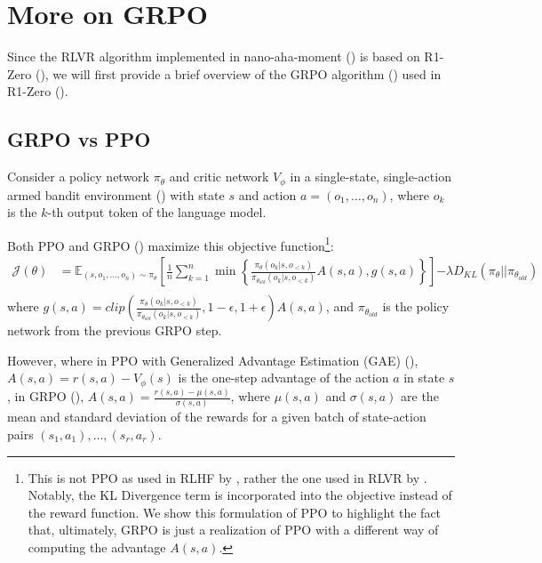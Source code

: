 \documentclass{article} %
\theoremstyle{definition}
\begin{document}
\section{More on GRPO}

Since the RLVR algorithm implemented in nano-aha-moment (\cite{nano-aha-moment}) is based on 
R1-Zero (\cite{r1}), we will first provide a brief overview of the GRPO
algorithm (\cite{grpo}) used in R1-Zero (\cite{r1}).

\subsection{GRPO vs PPO}
Consider a policy network $\pi_\theta$ and critic network $V_\phi$ in a single-state,
single-action armed bandit environment (\cite{Sutton-and-Barto-1998, contextualbandit}) 
with state $s$ and action $a = (o_1, \dots, o_n)$,
where $o_k$ is the $k$-th output token of the language model.

Both PPO and GRPO (\cite{ppo, grpo}) maximize this objective function\footnote{
    This is not PPO as used in RLHF by \cite{InstructGPT-2022}, rather the one used in RLVR by \cite{grpo}.
    Notably, the KL Divergence term is incorporated into the objective instead of the reward function.
    We show this formulation of PPO to highlight the fact that, ultimately, GRPO is just a 
    realization of PPO with a different way of computing the advantage $A(s, a)$.
}:
\begin{equation}
    \label{eq:obj-fn}
    \begin{array}{rl}
        \mathcal{J}(\theta) &= \mathbb{E}_{(s, o_1, \dots, o_n) \sim \pi_\theta} \left[ 
            \displaystyle
            \frac{1}{n} \sum_{k = 1}^n \min \left\{
                \frac{\pi_\theta(o_k|s, o_{< k})}{\pi_{\theta_{old}}(o_k|s, o_{< k})} A(s, a),
                g(s, a)
            \right\}
        \right] {\displaystyle - \lambda D_{KL}(\pi_\theta || \pi_{\theta_{old}})} \\
    \end{array}
\end{equation}
where ${\displaystyle g(s, a) = clip\left(\frac{\pi_\theta(o_k|s, o_{< k})}{\pi_{\theta_{old}}(o_k|s, o_{< k})}, 1 - \epsilon, 1 + \epsilon \right) A(s, a)}$,
and $\pi_{\theta_{old}}$ is the policy network from the previous GRPO step.


However, where in PPO with Generalized Advantage Estimation (GAE) (\cite{ppo, gae}), $A(s, a) = r(s, a) - V_\phi(s)$ is the one-step advantage of the action $a$ in state $s$,
in GRPO (\cite{grpo}), $A(s, a) = \frac{r(s, a) - \mu(s, a)}{\sigma(s, a)}$, where $\mu(s, a)$ and $\sigma(s, a)$ are the mean and standard deviation of the rewards for a given batch of state-action
pairs $(s_1, a_1), \dots, (s_r, a_r)$.
\end{document}
